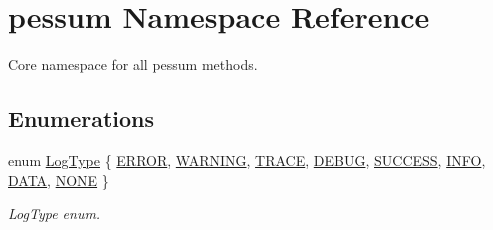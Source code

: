\hypertarget{namespacepessum}{}\section{pessum Namespace Reference}
\label{namespacepessum}


Core namespace for all pessum methods.  


\subsection*{Enumerations}
\begin{DoxyCompactItemize}
\item 
enum \hyperlink{namespacepessum_a0e205f64abc046e94dd38be906430664}{Log\+Type} \{ \newline
\hyperlink{namespacepessum_a0e205f64abc046e94dd38be906430664a7a719db795e4160dc868c74f3981091b}{E\+R\+R\+OR}, 
\hyperlink{namespacepessum_a0e205f64abc046e94dd38be906430664a5c036e27d2b7f92b600a03d53a5906cf}{W\+A\+R\+N\+I\+NG}, 
\hyperlink{namespacepessum_a0e205f64abc046e94dd38be906430664a99b12a4d8b49bcebb424e72729949bed}{T\+R\+A\+CE}, 
\hyperlink{namespacepessum_a0e205f64abc046e94dd38be906430664a0778c6a211502710df227ef928d45ac0}{D\+E\+B\+UG}, 
\newline
\hyperlink{namespacepessum_a0e205f64abc046e94dd38be906430664a50d013cdaa96d4575835e431e53afb92}{S\+U\+C\+C\+E\+SS}, 
\hyperlink{namespacepessum_a0e205f64abc046e94dd38be906430664a8354844e351c940c08caf14148d082b0}{I\+N\+FO}, 
\hyperlink{namespacepessum_a0e205f64abc046e94dd38be906430664a044bedc99450343e093dc4e9c51fb560}{D\+A\+TA}, 
\hyperlink{namespacepessum_a0e205f64abc046e94dd38be906430664a6d5037a5f004dc37956db8cc5fefed5e}{N\+O\+NE}
 \}\begin{DoxyCompactList}\small\item\em Log\+Type enum. \end{DoxyCompactList}
\end{DoxyCompactItemize}
